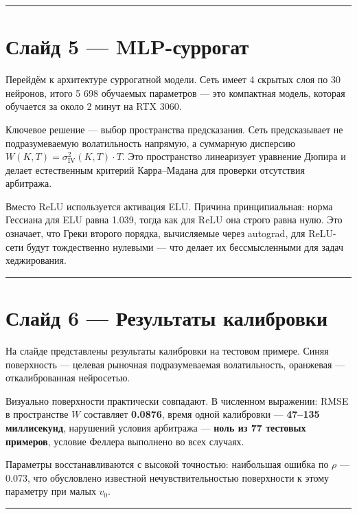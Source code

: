 \documentclass[12pt,a4paper]{article}
\begin{document}
\vspace{1em}\hrule\vspace{1em}

\section*{Слайд 5 — MLP-суррогат}

Перейдём к архитектуре суррогатной модели. Сеть имеет 4 скрытых слоя по 30 нейронов, итого 5 698 обучаемых параметров — это компактная модель, которая обучается за около 2 минут на RTX 3060.

Ключевое решение — выбор пространства предсказания. Сеть предсказывает не подразумеваемую волатильность напрямую, а суммарную дисперсию $W(K,T) = \sigma_{\text{IV}}^2(K,T) \cdot T$. Это пространство линеаризует уравнение Дюпира и делает естественным критерий Карра–Мадана для проверки отсутствия арбитража.

Вместо ReLU используется активация ELU. Причина принципиальная: норма Гессиана для ELU равна 1.039, тогда как для ReLU она строго равна нулю. Это означает, что Греки второго порядка, вычисляемые через autograd, для ReLU-сети будут тождественно нулевыми — что делает их бессмысленными для задач хеджирования.

\vspace{1em}\hrule\vspace{1em}

\section*{Слайд 6 — Результаты калибровки}

На слайде представлены результаты калибровки на тестовом примере. Синяя поверхность — целевая рыночная подразумеваемая волатильность, оранжевая — откалиброванная нейросетью.

Визуально поверхности практически совпадают. В численном выражении: RMSE в пространстве $W$ составляет \textbf{0.0876}, время одной калибровки — \textbf{47–135 миллисекунд}, нарушений условия арбитража — \textbf{ноль из 77 тестовых примеров}, условие Феллера выполнено во всех случаях.

Параметры восстанавливаются с высокой точностью: наибольшая ошибка по $\rho$ — 0.073, что обусловлено известной нечувствительностью поверхности к этому параметру при малых $v_0$.

\vspace{1em}\hrule\vspace{1em}
\end{document}
